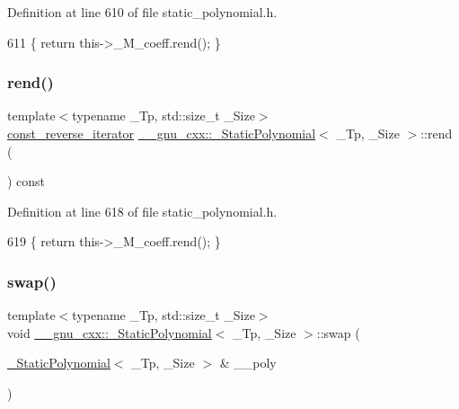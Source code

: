 Definition at line 610 of file static\+\_\+polynomial.\+h.


\begin{DoxyCode}
611       \{ \textcolor{keywordflow}{return} this->\_M\_coeff.rend(); \}
\end{DoxyCode}
\mbox{\label{class____gnu__cxx_1_1__StaticPolynomial_ad39f8cb28001cdfa18776c50160c5ce7}} 
\subsubsection{\texorpdfstring{rend()}{rend()}\hspace{0.1cm}{\footnotesize\ttfamily [2/2]}}
{\footnotesize\ttfamily template$<$typename \+\_\+\+Tp, std\+::size\+\_\+t \+\_\+\+Size$>$ \\
\hyperlink{class____gnu__cxx_1_1__StaticPolynomial_ae59b7bc5bdf7c61e562e8c4c8eaf904d}{const\+\_\+reverse\+\_\+iterator} \hyperlink{class____gnu__cxx_1_1__StaticPolynomial}{\+\_\+\+\_\+gnu\+\_\+cxx\+::\+\_\+\+Static\+Polynomial}$<$ \+\_\+\+Tp, \+\_\+\+Size $>$\+::rend (\begin{DoxyParamCaption}{ }\end{DoxyParamCaption}) const\hspace{0.3cm}{\ttfamily [inline]}}



Definition at line 618 of file static\+\_\+polynomial.\+h.


\begin{DoxyCode}
619       \{ \textcolor{keywordflow}{return} this->\_M\_coeff.rend(); \}
\end{DoxyCode}
\mbox{\label{class____gnu__cxx_1_1__StaticPolynomial_ae855be318bb050b83769beda4df280ec}} 
\subsubsection{\texorpdfstring{swap()}{swap()}}
{\footnotesize\ttfamily template$<$typename \+\_\+\+Tp, std\+::size\+\_\+t \+\_\+\+Size$>$ \\
void \hyperlink{class____gnu__cxx_1_1__StaticPolynomial}{\+\_\+\+\_\+gnu\+\_\+cxx\+::\+\_\+\+Static\+Polynomial}$<$ \+\_\+\+Tp, \+\_\+\+Size $>$\+::swap (\begin{DoxyParamCaption}\item[{\hyperlink{class____gnu__cxx_1_1__StaticPolynomial}{\+\_\+\+Static\+Polynomial}$<$ \+\_\+\+Tp, \+\_\+\+Size $>$ \&}]{\+\_\+\+\_\+poly }\end{DoxyParamCaption})\hspace{0.3cm}{\ttfamily [inline]}}

